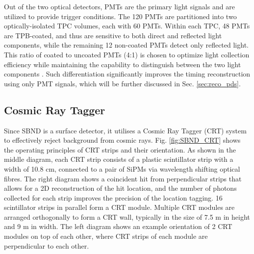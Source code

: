Out of the two optical detectors, PMTs are the primary light signals and are utilized to provide trigger conditions.
The 120 PMTs are partitioned into two optically-isolated TPC volumes, each with 60 PMTs.
Within each TPC, 48 PMTs are TPB-coated, and thus are sensitive to both direct and reflected light components, while the remaining 12 non-coated PMTs detect only reflected light. 
This ratio of coated to uncoated PMTs (4:1) is chosen to optimize light collection efficiency while maintaining the capability to distinguish between the two light components \cite{sbnd_pds_paper}. 
Such differentiation significantly improves the timing reconstruction using only PMT signals, which will be further discussed in Sec. \ref{sec:reco_pds}.

\subsection{Cosmic Ray Tagger}
\label{sec:sbnd_crt}

Since SBND is a surface detector, it utilises a Cosmic Ray Tagger (CRT) system to effectively reject background from cosmic rays.                                                         
Fig. \ref{fig:SBND_CRT} shows the operating principles of CRT strips and their orientation.                                                                                                 
As shown in the middle diagram, each CRT strip consists of a plastic scintillator strip with a width of 10.8 cm, connected to a pair of SiPMs via wavelength shifting optical fibres.       
The right diagram shows a coincident hit from perpendicular strips that allows for a 2D reconstruction of the hit location, and the number of photons collected for each strip improves the precision of the location tagging.                                                                                                                                                                     
16 scintillator strips in parallel form a CRT module.                                                                                                                                       
Multiple CRT modules are arranged orthogonally to form a CRT wall, typically in the size of 7.5 m in height and 9 m in width.                                                                  
The left diagram shows an example orientation of 2 CRT modules on top of each other, where CRT strips of each module are perpendicular to each other.                                       
                                                                                                                                                                                            
